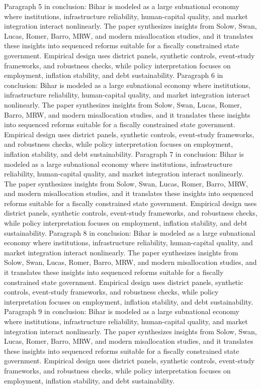 \documentclass[preprint,12pt]{elsarticle}
\begin{document}
Paragraph 5 in conclusion: Bihar is modeled as a large subnational economy where institutions, infrastructure reliability, human-capital quality, and market integration interact nonlinearly. The paper synthesizes insights from Solow, Swan, Lucas, Romer, Barro, MRW, and modern misallocation studies, and it translates these insights into sequenced reforms suitable for a fiscally constrained state government. Empirical design uses district panels, synthetic controls, event-study frameworks, and robustness checks, while policy interpretation focuses on employment, inflation stability, and debt sustainability.
Paragraph 6 in conclusion: Bihar is modeled as a large subnational economy where institutions, infrastructure reliability, human-capital quality, and market integration interact nonlinearly. The paper synthesizes insights from Solow, Swan, Lucas, Romer, Barro, MRW, and modern misallocation studies, and it translates these insights into sequenced reforms suitable for a fiscally constrained state government. Empirical design uses district panels, synthetic controls, event-study frameworks, and robustness checks, while policy interpretation focuses on employment, inflation stability, and debt sustainability.
Paragraph 7 in conclusion: Bihar is modeled as a large subnational economy where institutions, infrastructure reliability, human-capital quality, and market integration interact nonlinearly. The paper synthesizes insights from Solow, Swan, Lucas, Romer, Barro, MRW, and modern misallocation studies, and it translates these insights into sequenced reforms suitable for a fiscally constrained state government. Empirical design uses district panels, synthetic controls, event-study frameworks, and robustness checks, while policy interpretation focuses on employment, inflation stability, and debt sustainability.
Paragraph 8 in conclusion: Bihar is modeled as a large subnational economy where institutions, infrastructure reliability, human-capital quality, and market integration interact nonlinearly. The paper synthesizes insights from Solow, Swan, Lucas, Romer, Barro, MRW, and modern misallocation studies, and it translates these insights into sequenced reforms suitable for a fiscally constrained state government. Empirical design uses district panels, synthetic controls, event-study frameworks, and robustness checks, while policy interpretation focuses on employment, inflation stability, and debt sustainability.
Paragraph 9 in conclusion: Bihar is modeled as a large subnational economy where institutions, infrastructure reliability, human-capital quality, and market integration interact nonlinearly. The paper synthesizes insights from Solow, Swan, Lucas, Romer, Barro, MRW, and modern misallocation studies, and it translates these insights into sequenced reforms suitable for a fiscally constrained state government. Empirical design uses district panels, synthetic controls, event-study frameworks, and robustness checks, while policy interpretation focuses on employment, inflation stability, and debt sustainability.
\end{document}
